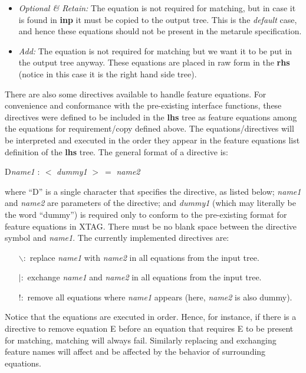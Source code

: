 \begin{itemize}
\item   {\it Optional \& Retain:} 
        The equation is not required for matching, but
        in case it is found in {\bf inp} it must be copied to the output tree.
        This is the {\it default} case, and hence these equations should not be
        present in the metarule specification.

\item   {\it Add:} The equation is not required for matching but we want it to
        be put in the output tree anyway.
        These equations are placed in raw form in the {\bf rhs} (notice in this
        case it is the right hand side tree).
\end{itemize}

There are also some directives available to handle feature equations. For 
convenience and conformance with the pre-existing interface functions,
these directives were defined to be included in the {\bf lhs} tree as feature 
equations among the equations for requirement/copy defined above. The
equations/directives will be interpreted and executed 
in the order they appear in the feature equations list definition 
of the {\bf lhs} tree. The general format of a directive is:

\centerline{D{\it{}name1} $:\ <$ {\it{}dummy1} $>\ =$ {\it{}name2}}

where ``D'' is a single character that specifies the directive, 
as listed below;
{\it name1} and {\it name2} are parameters of the directive; 
and {\it dummy1} (which may literally be the word ``dummy'') is required only
to conform to the pre-existing format for feature equations in XTAG.
There must be no blank space between the directive symbol and {\it name1}.
The currently implemented directives are:

\begin{itemize}
\item[$\backslash :$] replace {\it name1} with {\it name2} in all 
	equations from
	the input tree.
\item[{$|:$}] exchange {\it name1} and {\it name2} in all equations from
	the input tree.
\item[{$!:$}] remove all equations where {\it name1} appears 
	(here, {\it name2} is also dummy).
\end{itemize}

Notice that the equations are executed in order. Hence, for instance, if there
is a directive to remove equation E before an equation that requires E to
be present for matching, matching will always fail. Similarly replacing and
exchanging feature names will affect and be affected by the behavior of
surrounding equations. 

